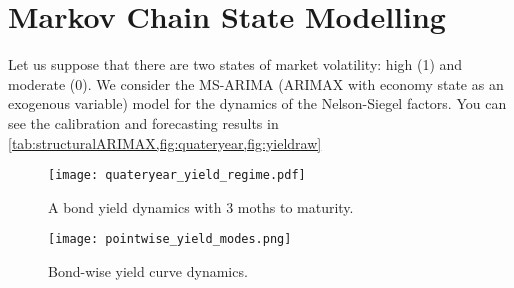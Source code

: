 \section{Markov Chain State Modelling}\label{sec:MCSM}
    Let us suppose that there are two states of market volatility: high (1) and moderate (0).
    We consider the MS-ARIMA (ARIMAX with economy state as an exogenous variable) model for the dynamics of the Nelson-Siegel factors.
    You can see the calibration and forecasting results in \cref{tab:structuralARIMAX,fig:quateryear,fig:yieldraw}



    \begin{figure}[htbp]
        \texttt{[image: quateryear\_yield\_regime.pdf]}
        \caption{A bond yield dynamics with 3 moths to maturity.}
        \label{fig:quateryear}
    \end{figure}

    \begin{figure}[htbp]
        \texttt{[image: pointwise\_yield\_modes.png]}
        \caption{Bond-wise yield curve dynamics.}
        \label{fig:yieldraw}
    \end{figure}

